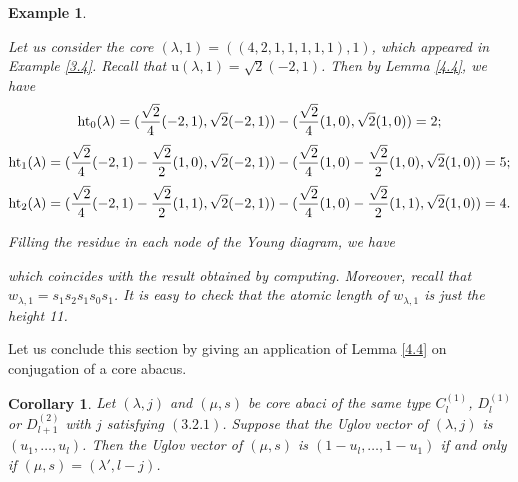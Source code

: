 \documentclass[11pt]{amsart}
\theoremstyle{plain}
\numberwithin{equation}{subsection}
\newtheorem{corollary}[theorem]{Corollary}
\newtheorem{example}[theorem]{Example}
\newcommand{\lam}{\lambda}
\begin{document}
\begin{example}\label{4.7}\rm{
Let us consider the core $(\lam, 1)=((4,2,1,1,1,1,1), 1)$, which appeared in Example \ref{3.4}. Recall that $\mathrm{u}(\lam, 1)=\sqrt{2}(-2, 1)$.
Then by Lemma \ref{4.4}, we have
$${\rm ht}_0(\lambda)=(\frac{\sqrt{2}}{4}(-2,1),\sqrt{2}(-2,1))-(\frac{\sqrt{2}}{4}(1,0),\sqrt{2}(1,0))=2;$$
$${\rm ht}_1(\lambda)=(\frac{\sqrt{2}}{4}(-2,1)-\frac{\sqrt{2}}{2}(1,0),\sqrt{2}(-2,1))-(\frac{\sqrt{2}}{4}(1,0)-\frac{\sqrt{2}}{2}(1,0),\sqrt{2}(1,0))=5;$$
$${\rm ht}_2(\lambda)=(\frac{\sqrt{2}}{4}(-2,1)-\frac{\sqrt{2}}{2}(1,1),\sqrt{2}(-2,1))-(\frac{\sqrt{2}}{4}(1,0)-\frac{\sqrt{2}}{2}(1,1),\sqrt{2}(1,0))=4.$$

Filling the residue in each node of the Young diagram, we have


which coincides with the result obtained by computing. Moreover,
recall that $w_{\lam, 1}=s_1s_2s_1s_0s_1$. It is easy to check that the atomic length of $w_{\lam, 1}$ is just the height 11.
}
\end{example}

Let us conclude this section by giving an application of Lemma \ref{4.4} on conjugation of a core abacus.

\begin{corollary}\label{4.8}
Let $(\lam, j)$ and $(\mu, s)$ be core abaci of the same type $C_l^{(1)}$, $D_l^{(1)}$ or $D_{l+1}^{(2)}$ with $j$ satisfying $(3.2.1)$. 
Suppose that the Uglov vector of $(\lam, j)$ is $(u_1, \dots, u_l)$. 
Then the Uglov vector of $(\mu, s)$ is $(1-u_l, \dots, 1-u_1)$ if and only if $(\mu, s)=(\lam', l-j)$.
\end{corollary}
\end{document}
